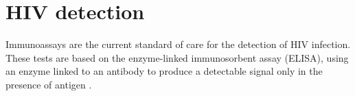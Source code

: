 \documentclass[../sherrill-Mix_thesis.tex]{subfiles}
\begin{document}









\section{HIV detection}
	Immunoassays are the current standard of care for the detection of HIV infection. These tests are based on the enzyme-linked immunosorbent assay (ELISA), using an enzyme linked to an antibody to produce a detectable signal only in the presence of antigen \citep{Yalow1960,Engvall1971,VanWeemen1971}. %
	
\end{document}

